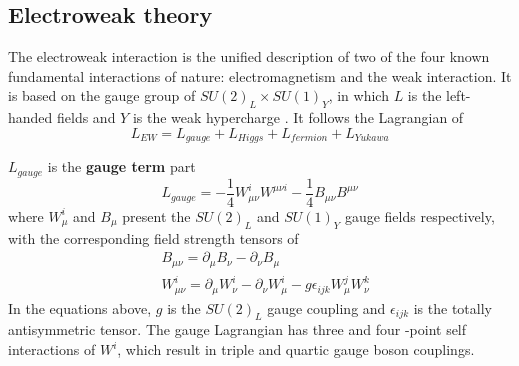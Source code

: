 \subsection{Electroweak theory}
\label{ewktheory}
The electroweak interaction is the unified description of two of the four known fundamental interactions of nature: electromagnetism and the weak interaction.
It is based on the gauge group of $SU(2)_{L} \times SU(1)_{Y}$, in which $L$ is the left-handed fields and $Y$ is the weak hypercharge \cite{Langacker:2009my}.
It follows the Lagrangian of
\begin{equation} \label{eq:Lew}
	L_{EW} = L_{gauge} + L_{Higgs} + L_{fermion} + L_{Yukawa}
\end{equation}

$L_{gauge}$ is the \textbf{gauge term} part
\begin{equation}
	L_{gauge} = -\frac{1}{4} W^{i}_{\mu\nu} W^{\mu\nu i} - \frac{1}{4} B_{\mu\nu} B^{\mu\nu}
\end{equation}
where $W^{i}_{\mu}$ and $B_{\mu}$ present the $SU(2)_{L}$ and $SU(1)_{Y}$ gauge fields respectively, with the corresponding field strength tensors of
\begin{equation}
\begin{split}
	& B_{\mu\nu} = \partial_{\mu} B_{\nu} - \partial_{\nu} B_{\mu} \\
	& W^{i}_{\mu\nu} = \partial_{\mu} W^{i}_{\nu} - \partial_{\nu} W^{i}_{\mu} - g \epsilon_{ijk} W^{j}_{\mu} W^{k}_{\nu}
\end{split}
\end{equation}
In the equations above, $g$ is the $SU(2)_{L}$ gauge coupling and $\epsilon_{ijk}$ is the totally antisymmetric tensor.
The gauge Lagrangian has three and four -point self interactions of $W^{i}$, which result in triple and quartic gauge boson couplings.

